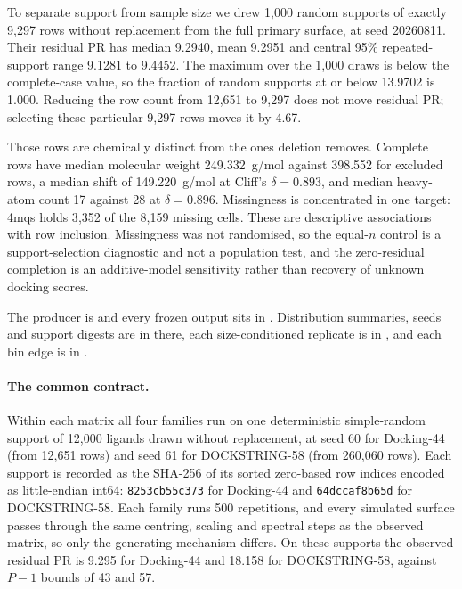 To separate support from sample size we drew 1{,}000 random supports of exactly 9{,}297 rows
without replacement from the full primary surface, at seed 20260811. Their residual PR has
median 9.2940, mean 9.2951 and central 95\% repeated-support range 9.1281 to 9.4452. The
maximum over the 1{,}000 draws is below the complete-case value, so the fraction of random
supports at or below 13.9702 is 1.000. Reducing the row count from 12{,}651 to 9{,}297 does not
move residual PR; selecting these particular 9{,}297 rows moves it by 4.67.

Those rows are chemically distinct from the ones deletion removes. Complete rows have median
molecular weight 249.332~g/mol against 398.552 for excluded rows, a median shift of
149.220~g/mol at Cliff's $\delta=0.893$, and median heavy-atom count 17 against 28 at
$\delta=0.896$. Missingness is concentrated in one target: 4mqs holds 3{,}352 of the 8{,}159
missing cells. These are descriptive associations with row inclusion. Missingness was not
randomised, so the equal-$n$ control is a support-selection diagnostic and not a population
test, and the zero-residual completion is an additive-model sensitivity rather than recovery of
unknown docking scores.


The producer is  and every frozen output sits in
. Distribution summaries, seeds and support digests
are in  there, each size-conditioned replicate is in
, and each bin edge is in
.

\paragraph{The common contract.} Within each matrix all four families run on one deterministic
simple-random support of 12{,}000 ligands drawn without replacement, at seed 60 for Docking-44
(from 12{,}651 rows) and seed 61 for DOCKSTRING-58 (from 260{,}060 rows). Each support is
recorded as the SHA-256 of its sorted zero-based row indices encoded as little-endian int64:
\texttt{8253cb55c373} for Docking-44 and \texttt{64dccaf8b65d} for DOCKSTRING-58. Each family
runs 500 repetitions, and every simulated surface passes through the same centring, scaling and
spectral steps as the observed matrix, so only the generating mechanism differs. On these
supports the observed residual PR is 9.295 for Docking-44 and 18.158 for DOCKSTRING-58, against
$P-1$ bounds of 43 and 57.

